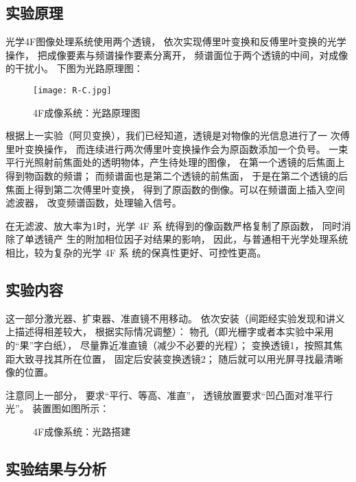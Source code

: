 \documentclass[11pt]{article}
\begin{document}
\subsection{实验原理}

光学4F图像处理系统使用两个透镜，
依次实现傅里叶变换和反傅里叶变换的光学操作，
把成像要素与频谱操作要素分离开，
频谱面位于两个透镜的中间，对成像的干扰小。
下图为光路原理图：
\begin{figure}[H]
    \centering
    \texttt{[image: R-C.jpg]}
    \caption{4F成像系统：光路原理图}
\end{figure}


根据上一实验（阿贝变换），我们已经知道，透镜是对物像的光信息进行了一
次傅里叶变换操作，
而连续进行两次傅里叶变换操作会为原函数添加一个负号。
一束平行光照射前焦面处的透明物体，产生待处理的图像，
在第一个透镜的后焦面上得到物函数的频谱；
而频谱面也是第二个透镜的前焦面，
于是在第二个透镜的后焦面上得到第二次傅里叶变换，
得到了原函数的倒像。可以在频谱面上插入空间滤波器，
改变频谱函数，处理输入信号。

在无滤波、放大率为1时，光学 4F 系
统得到的像函数严格复制了原函数，
同时消除了单透镜产
生的附加相位因子对结果的影响，
因此，与普通相干光学处理系统相比，较为复杂的光学 4F 系
统的保真性更好、可控性更高。

\subsection{实验内容}

这一部分激光器、扩束器、准直镜不用移动。
依次安装（间距经实验发现和讲义上描述得相差较大，
根据实际情况调整）：
物孔（即光栅字或者本实验中采用的“果”字白纸），
尽量靠近准直镜（减少不必要的光程）；
变换透镜1，按照其焦距大致寻找其所在位置，
固定后安装变换透镜2；
随后就可以用光屏寻找最清晰像的位置。


注意同上一部分，
要求“平行、等高、准直”，
透镜放置要求“凹凸面对准平行光”。
装置图如图所示：

\begin{figure}[H]
    \centering
    \hspace{0.3in}
    \caption{4F成像系统：光路搭建}
\end{figure}


\subsection{实验结果与分析}
\end{document}
